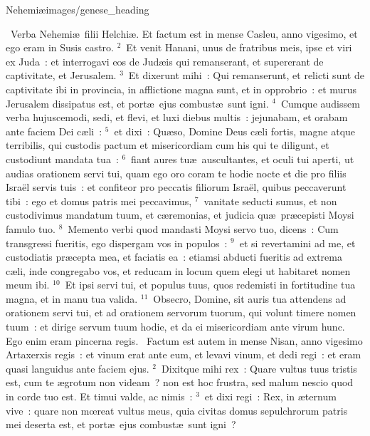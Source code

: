 {Nehemiæ}{images/genese_heading}

~\lettrine[lines=10,image=true,loversize=0.05,lraise=-0.03]{V}{}erba Nehemi\ae\ filii Helchi\ae . Et factum est in mense Casleu, anno vigesimo, et ego eram in Susis castro.
${}^{2}$~Et venit Hanani, unus de fratribus meis, ipse et viri ex Juda~: et interrogavi eos de Jud\ae is qui remanserant, et supererant de captivitate, et Jerusalem.
${}^{3}$~Et dixerunt mihi~: Qui remanserunt, et relicti sunt de captivitate ibi in provincia, in afflictione magna sunt, et in opprobrio~: et murus Jerusalem dissipatus est, et port\ae\ ejus combust\ae\ sunt igni.
${}^{4}$~Cumque audissem verba hujuscemodi, sedi, et flevi, et luxi diebus multis~: jejunabam, et orabam ante faciem Dei c\ae li~:
${}^{5}$~et dixi~: Qu\ae so, Domine Deus c\ae li fortis, magne atque terribilis, qui custodis pactum et misericordiam cum his qui te diligunt, et custodiunt mandata tua~:
${}^{6}$~fiant aures tu\ae\ auscultantes, et oculi tui aperti, ut audias orationem servi tui, quam ego oro coram te hodie nocte et die pro filiis Isra\"el servis tuis~: et confiteor pro peccatis filiorum Isra\"el, quibus peccaverunt tibi~: ego et domus patris mei peccavimus,
${}^{7}$~vanitate seducti sumus, et non custodivimus mandatum tuum, et c\ae remonias, et judicia qu\ae\ pr\ae cepisti Moysi famulo tuo.
${}^{8}$~Memento verbi quod mandasti Moysi servo tuo, dicens~: Cum transgressi fueritis, ego dispergam vos in populos~:
${}^{9}$~et si revertamini ad me, et custodiatis pr\ae cepta mea, et faciatis ea~: etiamsi abducti fueritis ad extrema c\ae li, inde congregabo vos, et reducam in locum quem elegi ut habitaret nomen meum ibi.
${}^{10}$~Et ipsi servi tui, et populus tuus, quos redemisti in fortitudine tua magna, et in manu tua valida.
${}^{11}$~Obsecro, Domine, sit auris tua attendens ad orationem servi tui, et ad orationem servorum tuorum, qui volunt timere nomen tuum~: et dirige servum tuum hodie, et da ei misericordiam ante virum hunc. Ego enim eram pincerna regis.
~\lettrine[lines=10,image=true,loversize=0.05,lraise=-0.03]{F}{}actum est autem in mense Nisan, anno vigesimo Artaxerxis regis~: et vinum erat ante eum, et levavi vinum, et dedi regi~: et eram quasi languidus ante faciem ejus.
${}^{2}$~Dixitque mihi rex~: Quare vultus tuus tristis est, cum te \ae grotum non videam~? non est hoc frustra, sed malum nescio quod in corde tuo est. Et timui valde, ac nimis~:
${}^{3}$~et dixi regi~: Rex, in \ae ternum vive~: quare non mœreat vultus meus, quia civitas domus sepulchrorum patris mei deserta est, et port\ae\ ejus combust\ae\ sunt igni~?
